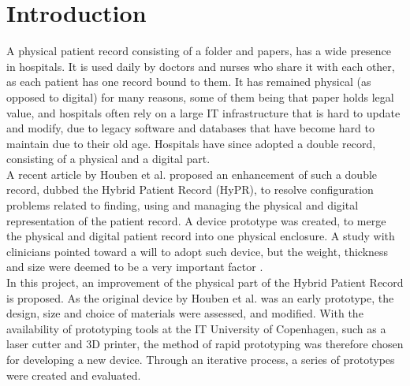 \section{Introduction}

A physical patient record consisting of a folder and papers, has a wide presence in hospitals. It is used daily by doctors and nurses who share it with each other, as each patient has one record bound to them. It has remained physical (as opposed to digital) for many reasons, some of them being that paper holds legal value, and hospitals often rely on a large IT infrastructure that is hard to update and modify, due to legacy software and databases that have become hard to maintain due to their old age. Hospitals have since adopted a double record, consisting of a physical and a digital part. \\

A recent article by Houben et al. proposed an enhancement of such a double record, dubbed the Hybrid Patient Record (HyPR), to resolve configuration problems related to finding, using and managing the physical and digital representation of the patient record. A device prototype was created, to merge the physical and digital patient record
into one physical enclosure. A study with clinicians pointed toward a will to adopt such device, but the weight, thickness and size were deemed to be a very important factor \cite{hypr}. \\

In this project, an improvement of the physical part of the Hybrid Patient Record is proposed. As the original device by Houben et al. was an early prototype, the design, size and choice of materials were assessed, and modified. With the availability of prototyping tools at the IT University of Copenhagen, such as a laser cutter and 3D printer, the method of rapid prototyping was therefore chosen for developing a new device. Through an iterative process, a series of prototypes were created and evaluated. 

\clearpage